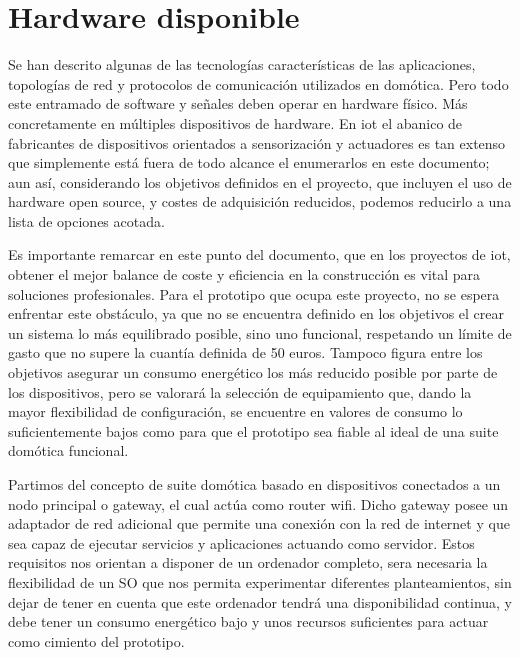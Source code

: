 \section{Hardware disponible}
\label{ch:Capitulo2.4}

Se han descrito algunas de las tecnologías características de las aplicaciones, topologías de red y protocolos de comunicación utilizados en domótica. Pero todo este entramado de software y señales deben operar en hardware físico. Más concretamente en múltiples dispositivos de hardware. En \gls{iot} el abanico de fabricantes de dispositivos orientados a sensorización y actuadores es tan extenso que simplemente está fuera de todo alcance el enumerarlos en este documento; aun así, considerando los objetivos definidos en el proyecto, que incluyen el uso de hardware open source, y costes de adquisición reducidos, podemos reducirlo a una lista de opciones acotada.

\vspace{1.5cm}

Es importante remarcar en este punto del documento, que en los proyectos de \gls{iot}, obtener el mejor balance de coste y eficiencia en la construcción es vital para soluciones profesionales. Para el prototipo que ocupa este proyecto, no se espera enfrentar este obstáculo, ya que no se encuentra definido en los objetivos el crear un sistema lo más equilibrado posible, sino uno funcional, respetando un límite de gasto que no supere la cuantía definida de 50 euros. Tampoco figura entre los objetivos asegurar un consumo energético los más reducido posible por parte de los dispositivos, pero se valorará la selección de equipamiento que, dando la mayor flexibilidad de configuración, se encuentre en valores de consumo lo suficientemente bajos como para que el prototipo sea fiable al ideal de una suite domótica funcional.

\vspace{1.5cm}

Partimos del concepto de suite domótica basado en dispositivos conectados a un nodo principal o \gls{gateway}, el cual actúa como router \gls{wifi}. Dicho \gls{gateway} posee un adaptador de red adicional que permite una conexión con la red de internet y que sea capaz de ejecutar servicios y aplicaciones actuando como servidor. Estos requisitos nos orientan a disponer de un ordenador completo, sera necesaria la flexibilidad de un SO que nos permita experimentar diferentes planteamientos, sin dejar de tener en cuenta que este ordenador tendrá una disponibilidad continua, y debe tener un consumo energético bajo y unos recursos suficientes para actuar como cimiento del prototipo.

